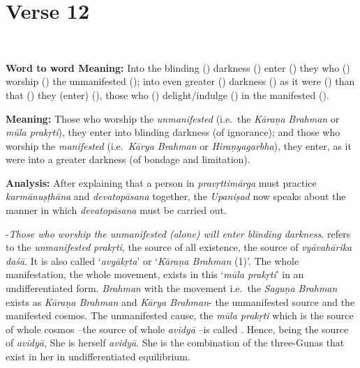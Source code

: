 \chapter{Verse 12}

\begin{moolashloka}
\\
\end{moolashloka}

\textbf{Word to word Meaning:} Into the blinding () darkness () enter () they who () worship () the unmanifested (); into even greater () darkness () as it were () than that () they (enter) (), those who () delight/indulge () in the manifested ().
\vskip 2.5pt

\textbf{Meaning:} Those who worship the \emph{unmanifested} (i.e.\ the \emph{Kāraṇa} \emph{Brahman} or \emph{mūla prakṛti}), they enter into blinding darkness (of ignorance); and those who worship the \emph{manifested} (i.e.\ \emph{Kārya Brahman} or \emph{Hiraṇyagarbha}), they enter, as it were into a greater darkness (of bondage and limitation).
\vskip 2.5pt

\textbf{Analysis:} After explaining that a person in \emph{pravṛttimārga} must practice \emph{karmānuṣṭhāna} and \emph{devatopāsana} together, the \emph{Upaniṣad} now speaks about the manner in which \emph{devatopāsana} must be carried out.
\vskip 2.5pt

-\emph{Those who worship the unmanifested (alone) will enter blinding darkness.}  refers to the \emph{unmanifested} \emph{prakṛti}, the source of all existence, the source of \emph{vyāvahārika daśā}. It is also called `\emph{avyākṛta}' or `\emph{Kāraṇa Brahman} (1)'. The whole manifestation, the whole movement, exists in this `\emph{mūla prakṛti}' in an undifferentiated form. \emph{Brahman} with the movement i.e.\ the \emph{Saguṇa Brahman} exists as \emph{Kāraṇa Brahman} and \emph{Kārya Brahman}- the unmanifested source and the manifested cosmos. The unmanifested cause, the \emph{mūla prakṛti} which is the source of whole cosmos --the source of whole \emph{avidyā} --is called . Hence, being the source of \emph{avidyā}, She is herself \emph{avidyā}. She is the combination of the three-Gunas that exist in her in undifferentiated equilibrium.


